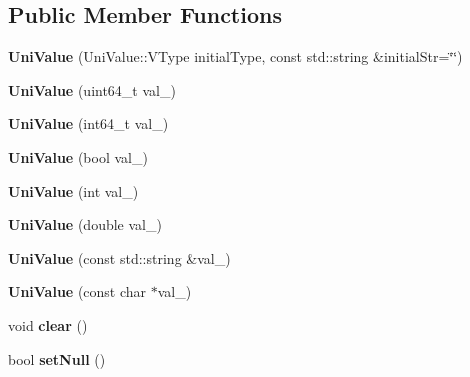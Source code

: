 \subsection*{Public Member Functions}
\begin{DoxyCompactItemize}
\item 
\mbox{\label{class_uni_value_a4745d05274d297cc29a60db6dbb9e327}} 
{\bfseries Uni\+Value} (Uni\+Value\+::\+V\+Type initial\+Type, const std\+::string \&initial\+Str=\char`\"{}\char`\"{})
\item 
\mbox{\label{class_uni_value_a0f9dfcd7460d60d6411b60c64049d37d}} 
{\bfseries Uni\+Value} (uint64\+\_\+t val\+\_\+)
\item 
\mbox{\label{class_uni_value_a8694292e69ccf3dfce68623c0c272f3d}} 
{\bfseries Uni\+Value} (int64\+\_\+t val\+\_\+)
\item 
\mbox{\label{class_uni_value_a14826f302ac6adf91e95d280ec013d63}} 
{\bfseries Uni\+Value} (bool val\+\_\+)
\item 
\mbox{\label{class_uni_value_ae5a206a921a99b69e53260097b4a6130}} 
{\bfseries Uni\+Value} (int val\+\_\+)
\item 
\mbox{\label{class_uni_value_a725504a9df25d6e4b76486a60edf0f3b}} 
{\bfseries Uni\+Value} (double val\+\_\+)
\item 
\mbox{\label{class_uni_value_aee7fb67988278b142b7d3fa5816035ea}} 
{\bfseries Uni\+Value} (const std\+::string \&val\+\_\+)
\item 
\mbox{\label{class_uni_value_a29044aa7b41758774f15fbaa12e587af}} 
{\bfseries Uni\+Value} (const char $\ast$val\+\_\+)
\item 
\mbox{\label{class_uni_value_a3d941ccb4afeb53cb104939e91c6f599}} 
void {\bfseries clear} ()
\item 
\mbox{\label{class_uni_value_a9532075643c9c9876fd0f1b62fcc3f92}} 
bool {\bfseries set\+Null} ()
\item 
\mbox{\label{class_uni_value_afd5b112dc63426ca6b0a6137041e0809}} 

\end{DoxyCompactItemize}
